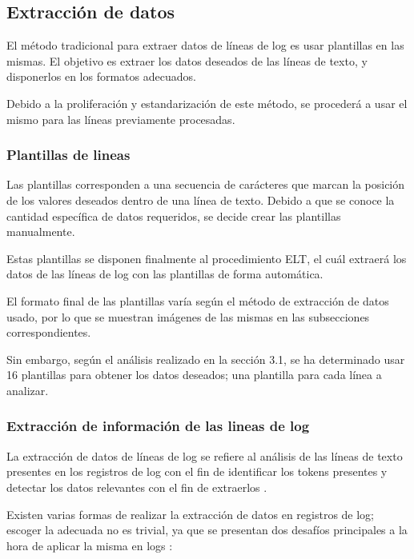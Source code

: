 \subsection{Extracción de datos}

El método tradicional para extraer datos de líneas de log es usar plantillas en las mismas. El objetivo es extraer los datos deseados de las líneas de texto, y disponerlos en los formatos adecuados.

Debido a la proliferación y estandarización de este método, se procederá a usar el mismo para las líneas previamente procesadas.

\subsubsection{Plantillas de lineas}

Las plantillas corresponden a una secuencia de carácteres que marcan la posición de los valores deseados dentro de una línea de texto. Debido a que se conoce la cantidad específica de datos requeridos, se decide crear las plantillas manualmente.

Estas plantillas se disponen finalmente al procedimiento ELT, el cuál extraerá los datos de las líneas de log con las plantillas de forma automática.

El formato final de las plantillas varía según el método de extracción de datos usado, por lo que se muestran imágenes de las mismas en las subsecciones correspondientes.

Sin embargo, según el análisis realizado en la sección 3.1, se ha determinado usar 16 plantillas para obtener los datos deseados; una plantilla para cada línea a analizar.

\subsubsection{Extracción de información de las lineas de log}

La extracción de datos de líneas de log se refiere al análisis de las líneas de texto presentes en los registros de log con el fin de identificar los tokens presentes y detectar los datos relevantes con el fin de extraerlos \cite{jayathilake2011mind}. 

Existen varias formas de realizar la extracción de datos en registros de log; escoger la adecuada no es trivial, ya que se presentan dos desafíos principales a la hora de aplicar la misma en logs \cite{jayathilake2011mind}:

